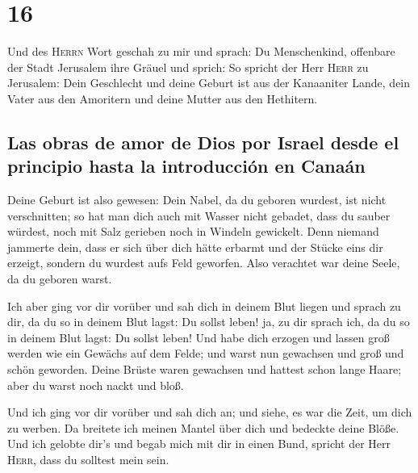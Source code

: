 \hypertarget{section-15}{%
\section{16}\label{section-15}}

 Und des \textsc{Herrn} Wort geschah zu mir und sprach:
 Du Menschenkind, offenbare der Stadt Jerusalem ihre
Gräuel und sprich:  So spricht der Herr \textsc{Herr} zu
Jerusalem: Dein Geschlecht und deine Geburt ist aus der Kanaaniter
Lande, dein Vater aus den Amoritern und deine Mutter aus den Hethitern.

\hypertarget{las-obras-de-amor-de-dios-por-israel-desde-el-principio-hasta-la-introducciuxf3n-en-canauxe1n}{%
\subsection{Las obras de amor de Dios por Israel desde el principio
hasta la introducción en
Canaán}\label{las-obras-de-amor-de-dios-por-israel-desde-el-principio-hasta-la-introducciuxf3n-en-canauxe1n}}

 Deine Geburt ist also gewesen: Dein Nabel, da du geboren
wurdest, ist nicht verschnitten; so hat man dich auch mit Wasser nicht
gebadet, dass du sauber würdest, noch mit Salz gerieben noch in Windeln
gewickelt.  Denn niemand jammerte dein, dass er sich über
dich hätte erbarmt und der Stücke eins dir erzeigt, sondern du wurdest
aufs Feld geworfen. Also verachtet war deine Seele, da du geboren warst.

 Ich aber ging vor dir vorüber und sah dich in deinem Blut
liegen und sprach zu dir, da du so in deinem Blut lagst: Du sollst
leben! ja, zu dir sprach ich, da du so in deinem Blut lagst: Du sollst
leben!  Und habe dich erzogen und lassen groß werden wie
ein Gewächs auf dem Felde; und warst nun gewachsen und groß und schön
geworden. Deine Brüste waren gewachsen und hattest schon lange Haare;
aber du warst noch nackt und bloß.

 Und ich ging vor dir vorüber und sah dich an; und siehe,
es war die Zeit, um dich zu werben. Da breitete ich meinen Mantel über
dich und bedeckte deine Blöße. Und ich gelobte dir's und begab mich mit
dir in einen Bund, spricht der Herr \textsc{Herr}, dass du solltest mein
sein.

